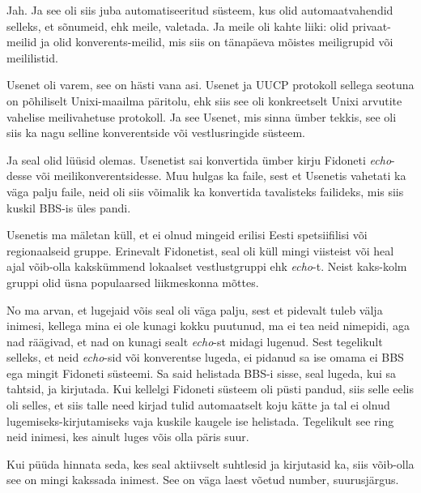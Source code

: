 Jah. Ja see oli siis juba automatiseeritud süsteem, kus olid automaatvahendid selleks, et sõnumeid, ehk  meile, valetada. Ja meile oli kahte liiki: olid privaat-meilid ja olid konverents-meilid, mis siis on tänapäeva mõistes meiligrupid või meililistid.


Usenet oli varem, see on hästi vana asi. Usenet ja UUCP protokoll sellega seotuna on põhiliselt  Unixi-maailma päritolu, ehk siis see oli konkreetselt Unixi arvutite vahelise meilivahetuse protokoll. Ja see Usenet, mis  sinna ümber tekkis,  see oli siis ka nagu selline konverentside või vestlusringide süsteem.


Ja seal olid lüüsid olemas. Usenetist sai konvertida ümber kirju Fidoneti \emph{echo}-desse või meilikonverentsidesse. Muu hulgas ka faile, sest et Usenetis vahetati ka väga palju faile,  neid oli siis võimalik ka konvertida tavalisteks failideks, mis siis kuskil BBS-is üles pandi.


Usenetis ma mäletan küll, et ei olnud mingeid erilisi Eesti spetsiifilisi või regionaalseid gruppe. Erinevalt Fidonetist, seal oli küll mingi viisteist või heal ajal võib-olla kakskümmend lokaalset  vestlustgruppi ehk \emph{echo}-t. Neist kaks-kolm gruppi olid üsna populaarsed liikmeskonna mõttes.


No ma arvan, et lugejaid võis seal oli väga palju, sest et pidevalt tuleb välja inimesi, kellega mina ei ole kunagi kokku puutunud, ma ei tea neid nimepidi, aga nad räägivad, et nad on kunagi sealt \emph{echo}-st  midagi lugenud. Sest tegelikult selleks, et neid \emph{echo}-sid või konverentse lugeda,  ei pidanud sa ise omama ei BBS ega mingit Fidoneti süsteemi. Sa said helistada BBS-i sisse, seal lugeda, kui sa tahtsid, ja kirjutada. Kui kellelgi Fidoneti süsteem oli püsti pandud, siis selle eelis oli selles, et siis talle need kirjad tulid automaatselt koju kätte ja tal ei olnud lugemiseks-kirjutamiseks vaja kuskile kaugele ise helistada. Tegelikult see ring  neid inimesi, kes  ainult luges võis olla päris suur. 

Kui püüda hinnata seda, kes seal aktiivselt suhtlesid ja kirjutasid ka, siis  võib-olla see on mingi kakssada inimest. See on väga laest võetud number, suurusjärgus.

